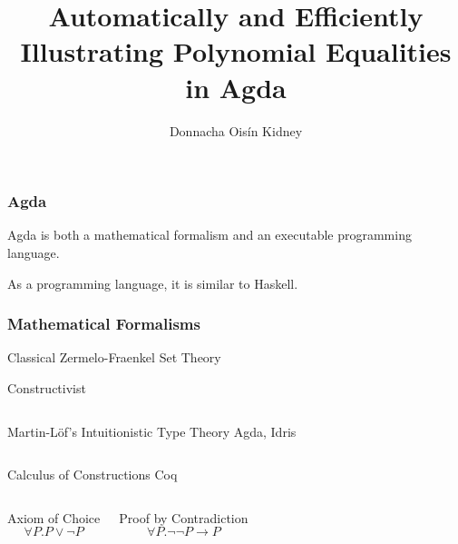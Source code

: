 \documentclass[usenames,dvipsnames]{beamer}
\title{Automatically and Efficiently Illustrating Polynomial Equalities in Agda}
\author{Donnacha Oisín Kidney}
\begin{document}

\maketitle
\begin{frame}
  \frametitle{Agda}
  Agda is both a mathematical formalism and an executable programming language.

  As a programming language, it is similar to Haskell.



\end{frame}
\begin{frame}
  \frametitle{Mathematical Formalisms}
  \begin{block}{Classical}
    Zermelo-Fraenkel Set Theory
  \end{block}

  \begin{block}{Constructivist}
    \medskip

    \begin{columns}
      Martin-Löf's Intuitionistic Type Theory
      Agda, Idris
    \end{columns}

    \bigskip

    \begin{columns}
      Calculus of Constructions
      Coq
    \end{columns}
  \end{block}


  \begin{columns}[T,onlytextwidth]
    \begin{alertblock}{Axiom of Choice}
      \[\forall P. P \vee \neg P\]
    \end{alertblock}
    \begin{alertblock}{Proof by Contradiction}
      \[\forall P. \neg \neg P \rightarrow P\]
    \end{alertblock}
  \end{columns}
\end{frame}
\end{document}
